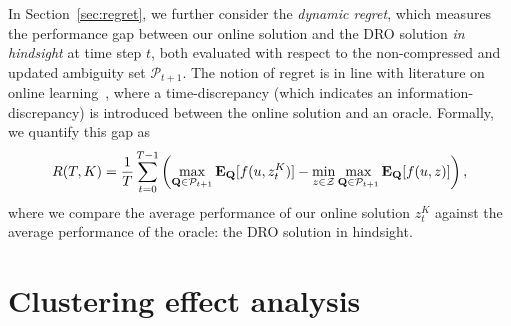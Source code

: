 In Section~\ref{sec:regret}, we further consider the {\it dynamic regret}, which  measures the performance gap between our online solution
and the \gls{DRO} solution {\it in hindsight} at time step $t$, both evaluated with respect to the non-compressed and updated 
ambiguity set $\mathcal{P}_{t+1}$.
The notion of regret is in line with literature on online learning~\cite{drotime,regret, regret2}, where a time-discrepancy (which indicates an information-discrepancy) is introduced between the online solution and an oracle. 
Formally, we quantify this gap as
\begin{equation}
\label{regret}
R(T,K) = \frac{1}{T}\sum_{t=0}^{T-1} \left(\max_{\mathbf{Q} \in \mathcal{P}_{t+1}} \mathbf{E}_{\mathbf{Q}}[f(u,z^K_{t})] - \min_{z \in \mathcal{Z}} \max_{\mathbf{Q} \in \mathcal{P}_{t+1}} \mathbf{E}_{\mathbf{Q}}[f(u,z)]\right),
\end{equation}
where we compare the average performance of our online solution $z^K_{t}$ against the average performance of the oracle: the \gls{DRO} solution in hindsight.



\section{Clustering effect analysis}
\label{sec:general_intro}

